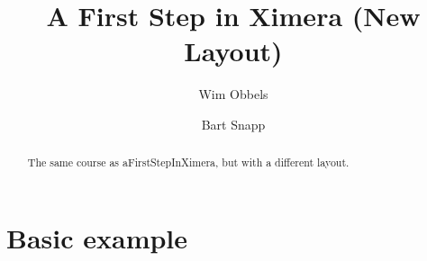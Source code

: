 \documentclass{xourse}
\author{Wim Obbels \and Bart Snapp}
\title{A First Step in Ximera (New Layout)}
\begin{document}
\begin{abstract}
    The same course as aFirstStepInXimera, but with a different layout.
\end{abstract}
\maketitle
\part{Basic example}

    \chapterstyle
    \sectionstyle

    \chapterstyle
\end{document}
